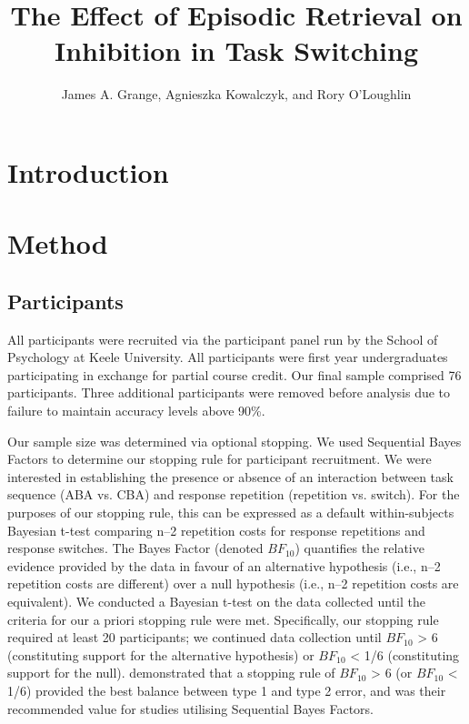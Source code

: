 \documentclass[a4paper, jou, natbib]{apa6}
\title{The Effect of Episodic Retrieval on Inhibition in Task Switching}
\author{James A. Grange, Agnieszka Kowalczyk, and Rory O'Loughlin}
\affiliation{School of Psychology, Keele University, UK}
\begin{document}
\maketitle

\section{Introduction}


\section{Method}

\subsection{Participants}
All participants were recruited via the participant panel run by the School of Psychology at Keele University. All participants were first year undergraduates participating in exchange for partial course credit. Our final sample comprised 76 participants. Three additional participants were removed before analysis due to failure to maintain accuracy levels above 90\%.

Our sample size was determined via optional stopping. We used Sequential Bayes Factors \citep{Schoenbrodtinpress} to determine our stopping rule for participant recruitment. We were interested in establishing the presence or absence of an interaction between task sequence (ABA vs. CBA) and response repetition (repetition vs. switch). For the purposes of our stopping rule, this can be expressed as a default within-subjects Bayesian t-test \citep{Rouder2009} comparing n--2 repetition costs for response repetitions and response switches. The Bayes Factor (denoted $BF_{10}$) quantifies the relative evidence provided by the data in favour of an alternative hypothesis (i.e., n--2 repetition costs are different) over a null hypothesis (i.e., n--2 repetition costs are equivalent). We conducted a Bayesian t-test on the data collected until the criteria for our a priori stopping rule were met. Specifically, our stopping rule required at least 20 participants; we continued data collection until $BF_{10}$ > 6 (constituting support for the alternative hypothesis) or $BF_{10}$ < 1/6 (constituting support for the null). \cite{Schoenbrodtinpress} demonstrated that a stopping rule of $BF_{10}$ > 6 (or $BF_{10}$ < 1/6) provided the best balance between type 1 and type 2 error, and was their recommended value for studies utilising Sequential Bayes Factors. 
\end{document}

